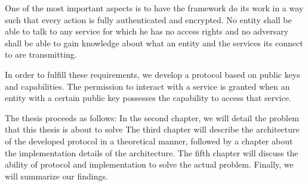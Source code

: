 One of the most important aspects is to have the framework do its work in a way such that every action is fully authenticated and encrypted.
No entity shall be able to talk to any service for which he has no access rights and no adversary shall be able to gain knowledge about what an entity and the services its connect to are transmitting.

In order to fulfill these requirements, we develop a protocol based on public keys and capabilities.
The permission to interact with a service is granted when an entity with a certain public key possesses the capability to access that service.

\bigskip

The thesis proceeds as follows:
In the second chapter, we will detail the problem that this thesis is about to solve
The third chapter will describe the architecture of the developed protocol in a theoretical manner, followed by a chapter about the implementation details of the architecture.
The fifth chapter will discuss the ability of protocol and implementation to solve the actual problem.
Finally, we will summarize our findings.

